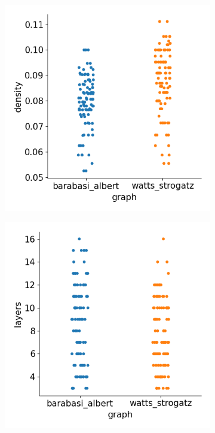 \begin{figure}[H]
    \bigskip
    \begin{subfigure}{0.45\textwidth}
        \includegraphics[width=\linewidth]{images/results/random/relu/graph_density.png}
        \caption{} \label{fig:relu_graph_density}
    \end{subfigure}
    \hfill
    \begin{subfigure}{0.45\textwidth}
        \includegraphics[width=\linewidth]{images/results/random/relu/graph_layers.png}
        \caption{} \label{fig:relu_graph_layers}
    \end{subfigure}


\end{figure}
